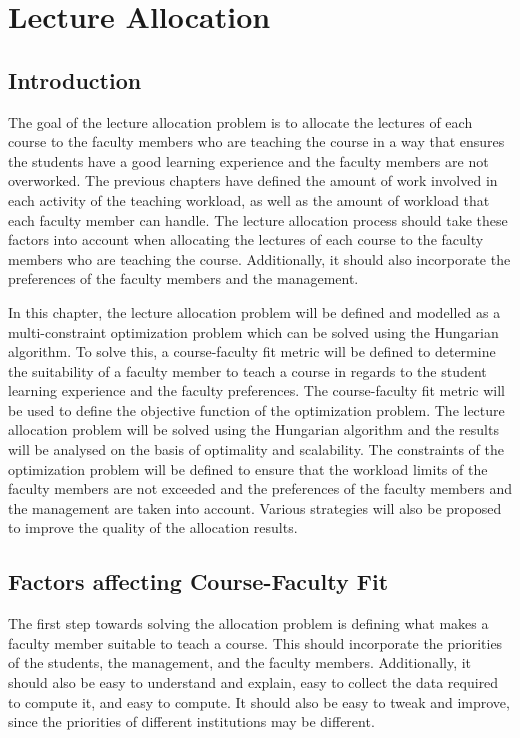 
\chapter{Lecture Allocation}

\section{Introduction}

The goal of the lecture allocation problem is to allocate the lectures of each course to the faculty members who are teaching the course in a way that ensures the students have a good learning experience and the faculty members are not overworked. The previous chapters have defined the amount of work involved in each activity of the teaching workload, as well as the amount of workload that each faculty member can handle. The lecture allocation process should take these factors into account when allocating the lectures of each course to the faculty members who are teaching the course. Additionally, it should also incorporate the preferences of the faculty members and the management.

In this chapter, the lecture allocation problem will be defined and modelled as a multi-constraint optimization problem which can be solved using the Hungarian algorithm. To solve this, a course-faculty fit metric will be defined to determine the suitability of a faculty member to teach a course in regards to the student learning experience and the faculty preferences. The course-faculty fit metric will be used to define the objective function of the optimization problem. The lecture allocation problem will be solved using the Hungarian algorithm and the results will be analysed on the basis of optimality and scalability. The constraints of the optimization problem will be defined to ensure that the workload limits of the faculty members are not exceeded and the preferences of the faculty members and the management are taken into account. Various strategies will also be proposed to improve the quality of the allocation results.

\section{Factors affecting Course-Faculty Fit}

The first step towards solving the allocation problem is defining what makes a faculty member suitable to teach a course. This should incorporate the priorities of the students, the management, and the faculty members. Additionally, it should also be easy to understand and explain, easy to collect the data required to compute it, and easy to compute. It should also be easy to tweak and improve, since the priorities of different institutions may be different.



